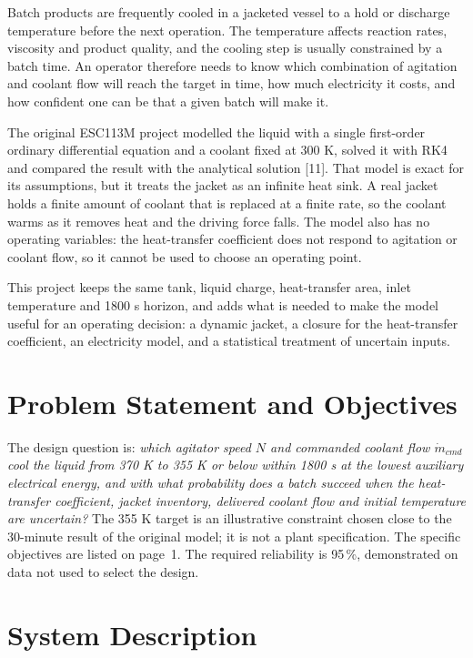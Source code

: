 \documentclass[11pt,letterpaper]{article}
\newcommand{\mdot}{\dot m}
\begin{document}
Batch products are frequently cooled in a jacketed vessel to a hold or discharge temperature before the next operation. The temperature affects reaction rates, viscosity and product quality, and the cooling step is usually constrained by a batch time. An operator therefore needs to know which combination of agitation and coolant flow will reach the target in time, how much electricity it costs, and how confident one can be that a given batch will make it.

The original ESC113M project modelled the liquid with a single first-order ordinary differential equation and a coolant fixed at 300 K, solved it with RK4 and compared the result with the analytical solution [11]. That model is exact for its assumptions, but it treats the jacket as an infinite heat sink. A real jacket holds a finite amount of coolant that is replaced at a finite rate, so the coolant warms as it removes heat and the driving force falls. The model also has no operating variables: the heat-transfer coefficient does not respond to agitation or coolant flow, so it cannot be used to choose an operating point.

This project keeps the same tank, liquid charge, heat-transfer area, inlet temperature and 1800 s horizon, and adds what is needed to make the model useful for an operating decision: a dynamic jacket, a closure for the heat-transfer coefficient, an electricity model, and a statistical treatment of uncertain inputs.

\section{Problem Statement and Objectives}

The design question is: \emph{which agitator speed \(N\) and commanded coolant flow \(\mdot_{cmd}\) cool the liquid from 370 K to 355 K or below within 1800 s at the lowest auxiliary electrical energy, and with what probability does a batch succeed when the heat-transfer coefficient, jacket inventory, delivered coolant flow and initial temperature are uncertain?} The 355 K target is an illustrative constraint chosen close to the 30-minute result of the original model; it is not a plant specification. The specific objectives are listed on page~1. The required reliability is 95\,\%, demonstrated on data not used to select the design.

\section{System Description}
\end{document}
